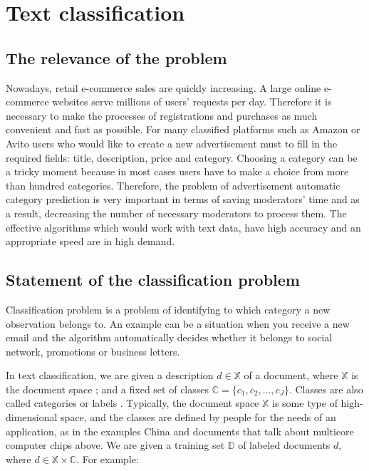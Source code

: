 \chapter{Text classification} \label{chapt1}

\section{The relevance of the problem} \label{sect1_1}

Nowadays, retail e-commerce sales are quickly increasing. A large online e-commerce
websites serve millions of users’ requests per day. Therefore it is necessary to make the processes of registrations and purchases as much convenient and fast as possible. For many classified platforms such as Amazon or Avito users who would like to create a new advertisement must to fill in the required fields: title, description, price and category. Choosing a category can be a tricky moment because in most cases users have to make a choice from more than hundred categories. Therefore, the problem  of advertisement automatic category prediction is very important in terms of saving moderators' time and as a result, decreasing the number of necessary moderators to process them. The effective algorithms which would work with text data, have high accuracy and an appropriate speed are in high demand.

\section{Statement of the classification problem} \label{sect1_2}


Classification problem is a problem of identifying to which category a new observation belongs to. An example can be a situation when you receive a new email and the algorithm automatically decides whether it belongs to social network, promotions or business letters.


\newcommand{\docsetlabeled}{\mathbb{D}}

In text classification, we are given a description  $d \in \mathbb{X}$ of a document, where $\mathbb{X}$ is the document space ; and a fixed set of classes  $\mathbb{C} = \{ c_1,c_2,\ldots,c_J \}$. Classes are also called categories or labels . Typically, the document space  $\mathbb{X}$ is some type of high-dimensional space, and the classes are defined by people for the needs of an application, as in the examples China and documents that talk about multicore computer chips above. We are given a training set  $\docsetlabeled$ of labeled documents  $d $, where  $d \in \mathbb{X} \times \mathbb{C}$. For example: 

